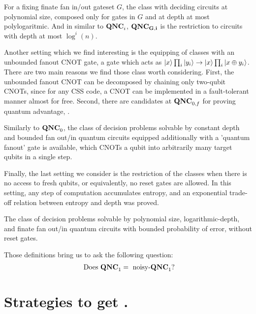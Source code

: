 \documentclass[manuscript,screen,review]{acmart}
\begin{document}
{\begin{definition}[$\QNCG{}$]
  For a fixing finate fan in/out gateset $G$, the class with deciding circuits at polynomial size, composed only for gates in $G$ and at depth at most polylogaritmic. And in similar to $\mathbf{QNC}_{i}{}$, $\mathbf{QNC_{G,i}}{}$ is the restriction to circuits with depth at most $\log^{i}(n)$.  
\end{definition}

Another setting which we find interesting is the equipping of classes with an unbounded fanout CNOT gate, a gate which acts as $\ket{x}\prod_{i}\ket{y_{i}} \rightarrow \ket{x}\prod_{i}\ket{x \oplus y_{i}}$. There are two main reasons we find those class worth considering. First, the unbounded fanout CNOT can be decomposed by chaining only two-qubit CNOTs, since for any CSS code, a CNOT can be implemented in a fault-tolerant manner almost for free. Second, there are candidates at $\mathbf{QNC}_{0,f}$ for proving quantum advantage\cite{Bremner_2017}, \cite{Paletta_2024}.


\begin{definition}[$\QNCzef{}$] 
Similarly to $\mathbf{QNC}_{0}{}$, the class of decision problems solvable by constant depth and bounded fan out/in quantum circuits equipped additionally with a 'quantum fanout' gate is available, which CNOTs a qubit into arbitrarily many target qubits in a single step.
\end{definition}

Finally, the last setting we consider is the restriction of the classes when there is no access to fresh qubits, or equivalently, no reset gates are allowed. In this setting, any step of computation accumulates entropy, and an exponential trade-off relation between entropy and depth was proved.

\begin{definition}
  The class of decision problems solvable by polynomial size,  logarithmic-depth, and finate fan out/in quantum circuits with bounded probability of error, without reset gates.
\end{definition}
Those definitions bring us to ask the following question:
\begin{equation*}
  \begin{split}
    \text{ Does } \mathbf{QNC}_{1}{} = \text{ noisy-}\mathbf{QNC}_{1}{} \text{?}
  \end{split}
\end{equation*}


  \section{ Strategies to get \CDO. }  \label{sec:opt}
 
}
\end{document}
